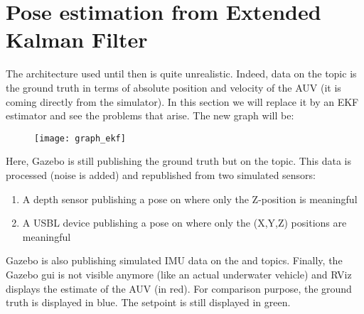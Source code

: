 \documentclass{ecnreport}
\begin{document}
%
%
%

%

\section{Pose estimation from Extended Kalman Filter}

The architecture used until then is quite unrealistic.
Indeed, data on the topic  is the ground truth in terms of absolute position and velocity of the AUV (it is coming
directly from the simulator).
In this section we will replace it by an EKF estimator and see the problems that arise. The new graph will be:
\begin{figure}[h]\centering
 \texttt{[image: graph\_ekf]}
\end{figure}

Here, Gazebo is still publishing the ground truth but on the  topic. This data is processed (noise is added) and republished from two simulated sensors:
\begin{enumerate}
  \item A depth sensor publishing a pose on  where only the Z-position is meaningful
  \item A USBL device publishing a pose on  where only the (X,Y,Z) positions are meaningful
\end{enumerate}
Gazebo is also publishing simulated IMU data on the  and  topics. 
Finally, the Gazebo gui is not visible anymore (like an actual underwater vehicle) and RViz displays the estimate of the AUV (in red). 
For comparison purpose, the ground truth is displayed in blue. The setpoint is still displayed in green.
\end{document}
